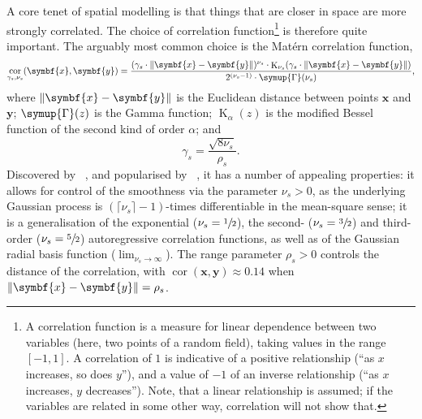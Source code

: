 \documentclass[british]{scrreprt}
\DeclareMathOperator{\cor}{cor}
\DeclareMathOperator{\BesselK}{K}
\begin{document}
A core tenet of spatial modelling is that things that are closer in space are more strongly correlated. The choice of correlation function\footnote{A correlation function is a measure for linear dependence between two variables (here, two points of a random field), taking values in the range \( [-1, 1] \). A correlation of \( 1 \) is indicative of a positive relationship (\enquote{as \( x \) increases, so does \( y \)}), and a value of \( -1 \) of an inverse relationship (\enquote{as \( x \) increases, \( y \) decreases}). Note, that a linear relationship is assumed; if the variables are related in some other way, correlation will not show that.}  is therefore quite important. The arguably most common choice is the Matérn correlation function,
\begin{equation}
    \cor_{\gamma_{s}, \nu_{s}}(\symbf{x}, \symbf{y}) = \frac{(\gamma_{s} \cdot \norm{\symbf{x} - \symbf{y}})^{\nu_{s}} \cdot \BesselK_{\nu_{s}}(\gamma_{s} \cdot \norm{\symbf{x} - \symbf{y}})}{2^{(\nu_{s} - 1)} \cdot \symup{\Gamma}(\nu_{s})}
    \label{eq:matern-cor}
    \text{,}
\end{equation}
where \( \norm{\symbf{x} - \symbf{y}} \) is the Euclidean distance between points \( \symbf{x} \) and \( \symbf{y} \); \( \symup{\Gamma}(z) \) is the Gamma function; \( \BesselK_{\alpha}(z) \) is the modified Bessel function of the second kind of order \( \alpha \); and 
\begin{equation}
    \gamma_{s} = \frac{\sqrt{8 \nu_{s}}}{\rho_{s}}
    \label{eq:gamma-s}
    \text{.}   
\end{equation}
Discovered by ~\cite{MaternSpatialvariation1960}, and popularised by ~\cite{SteinInterpolationSpatialData1999}, it has a number of appealing properties: it allows for control of the smoothness via the parameter \( \nu_{s} > 0 \), as the underlying Gaussian process is \( (\lceil \nu_{s} \rceil - 1) \)-times differentiable in the mean-square sense; it is a generalisation of the exponential (\( \nu_{s} = \sfrac{1}{2} \)), the second- (\( \nu_{s} = \sfrac{3}{2} \)) and third-order (\( \nu_{s} = \sfrac{5}{2} \)) autoregressive correlation functions, as well as of the Gaussian radial basis function (\( \lim_{\nu_{s} \rightarrow \infty} \)). The range parameter \( \rho_{s} > 0 \) controls the distance of the correlation, with \( \cor(\symbf{x}, \symbf{y}) \approx 0.14 \) when \( \norm{\symbf{x} - \symbf{y}} = \rho_{s} \).
\end{document}
